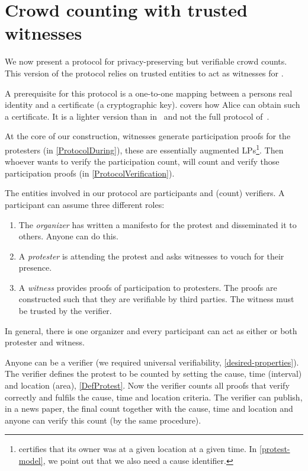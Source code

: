 \section{Crowd counting with trusted witnesses}%
\label{trusted-witnesses-protocol}

We now present a protocol for privacy-preserving but verifiable crowd
counts.
This version of the protocol relies on trusted entities to act as witnesses for 
.

A prerequisite for this protocol is a one-to-one mapping between a persons real 
identity and a certificate (\ie a cryptographic key).
 covers how Alice can obtain such a certificate.
It is a lighter version than in~\cite{SelfCertifiedSybilFreePseudonyms} and not 
the full protocol of~\cite{HowToWinTheCloneWars}.

At the core of our construction, witnesses generate participation proofs for 
the protesters (in \cref{ProtocolDuring}), these are essentially augmented 
\acp{LP}\footnote{%
   certifies that its owner was at a given location at a given time.
  In \cref{protest-model}, we point out that we also need a cause identifier.
}.
Then whoever wants to verify the participation count, will count and verify 
those participation proofs (in \cref{ProtocolVerification}). 

The entities involved in our protocol are participants and (count) verifiers.
A participant can assume three different roles:
\begin{enumerate}
\item The \emph{organizer} has written a manifesto for the protest and 
  disseminated it to others.
  Anyone can do this.
\item A \emph{protester} is attending the protest and asks witnesses to vouch 
  for their presence.
\item A \emph{witness} provides proofs of participation to protesters.
  The proofs are constructed such that they are verifiable by third parties.
  The witness must be trusted by the verifier.
\end{enumerate}
In general, there is one organizer and every participant can act as
either or both protester and witness.

Anyone can be a verifier (we required universal verifiability, 
\cref{desired-properties}).
The verifier defines the protest to be counted by setting the cause, time 
(interval) and location (area), \cf \cref{DefProtest}.
Now the verifier counts all proofs that verify correctly and fulfils the cause, 
time and location criteria.
The verifier can publish, \eg in a news paper, the final count together with 
the cause, time and location and anyone can verify this count (by the same 
procedure).

